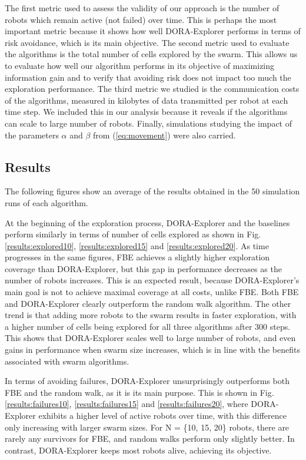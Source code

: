 \documentclass[letterpaper, 10 pt, conference]{ieeeconf}
\begin{document}
The first metric used to assess the validity of our approach is the
number of robots which remain active (not failed) over time. This is
perhaps the most important metric because it shows how well DORA-Explorer
performs in terms of risk avoidance, which is its main objective. The
second metric used to evaluate the algorithms is the total number of
cells explored by the swarm. This allows us to evaluate how well our
algorithm performs in its objective of maximizing information gain and
to verify that avoiding risk does not impact too much the exploration
performance. The third metric we studied is the communication costs of
the algorithms, measured in kilobytes of data transmitted per robot at
each time step. We included this in our analysis because it reveals if
the algorithms can scale to large number of robots. Finally, simulations studying the impact of the parameters $\alpha$ and $\beta$ from (\ref{eq:movement}) were also carried. 

\subsection{Results}
The following figures show an average of the results obtained in the
50 simulation runs of each algorithm.

At the beginning of the exploration process, DORA-Explorer and the baselines
perform similarly in terms of number of cells explored as shown in
Fig. \ref{results:explored10}, \ref{results:explored15} and
\ref{results:explored20}. As time progresses in the same figures, FBE
achieves a slightly higher exploration coverage than DORA-Explorer, but this
gap in performance decreases as the number of robots increases. This
is an expected result, because DORA-Explorer's main goal is not to achieve
maximal coverage at all costs, unlike FBE. Both FBE and DORA-Explorer clearly
outperform the random walk algorithm. The other trend is that adding
more robots to the swarm results in faster exploration, with a higher
number of cells being explored for all three algorithms after 300
steps. This shows that DORA-Explorer scales well to large number of robots, and
even gains in performance when swarm size increases, which is in line
with the benefits associated with swarm algorithms.

In terms of avoiding failures, DORA-Explorer unsurprisingly outperforms both
FBE and the random walk, as it is its main purpose. This is shown in
Fig. \ref{results:failures10}, \ref{results:failures15} and
\ref{results:failures20}, where DORA-Explorer exhibits a higher level of active
robots over time, with this difference only increasing with larger
swarm sizes. For N = \{10, 15, 20\} robots, there are rarely any
survivors for FBE, and random walks perform only slightly better. In
contrast, DORA-Explorer keeps most robots alive, achieving its objective.
\end{document}
